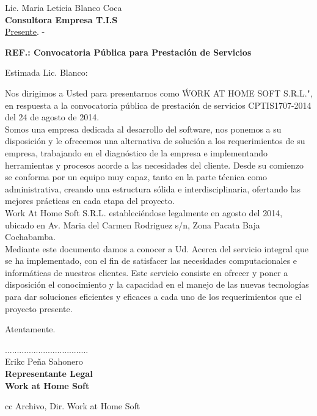 \documentclass[letterpaper,12pt]{letter}
\begin{document}
\date {Cochabamba, \today}
\begin{letter}{Lic. Maria Leticia Blanco Coca \\ {\bf Consultora Empresa T.I.S} \\ \underline {Presente}. -}

\begin{center}
	\opening{ \textbf{ REF.: Convocatoria Pública para Prestación de Servicios }}
\end{center}

Estimada Lic. Blanco:

Nos dirigimos a Usted para presentarnos como \' WORK AT HOME SOFT S.R.L.", en respuesta a la convocatoria pública de prestación de servicios CPTIS1707-2014 del 24 de agosto de 2014.\\

Somos una empresa dedicada al desarrollo del software, nos ponemos a su disposición y le ofrecemos una alternativa de solución a los requerimientos de su empresa, trabajando en el diagnóstico de la empresa e implementando herramientas y procesos acorde a las necesidades del cliente. Desde su comienzo se conforma por un equipo muy capaz, tanto en la parte técnica como administrativa, creando una estructura sólida e interdisciplinaria, ofertando las mejores prácticas en cada etapa del proyecto.\\

Work At Home Soft S.R.L. estableciéndose legalmente en agosto del 2014, ubicado en Av. Maria del Carmen Rodriguez s/n, Zona Pacata Baja Cochabamba.\\

Mediante este documento damos a conocer a Ud. Acerca del servicio integral que se ha implementado, con el fin de satisfacer las necesidades computacionales e informáticas de nuestros clientes. Este servicio consiste en ofrecer y poner a disposición el conocimiento y la capacidad en el manejo de las nuevas tecnologías para dar soluciones eficientes y eficaces a cada uno de los requerimientos que el proyecto presente.

Atentamente.

\vspace{0.50cm}

\begin{center}
...................................\\
Erikc Peña Sahonero\\
{\bfseries Representante Legal \\ Work at Home Soft}
\end{center}
\vspace{0.25cm}
cc Archivo, Dir. Work at Home Soft
\end{letter}
\end{document}
